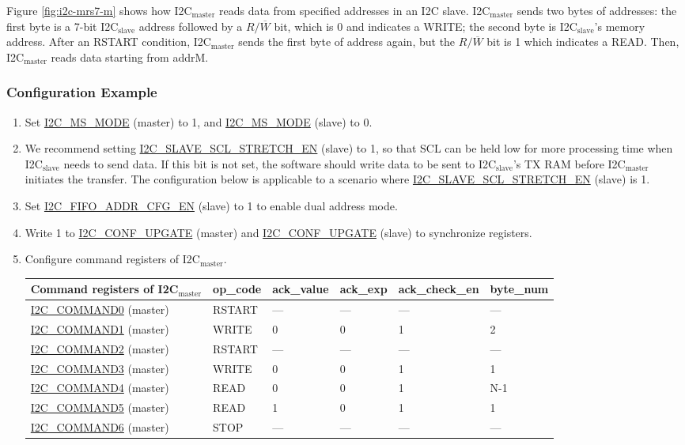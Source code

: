 \documentclass[main\_\_EN.tex]{subfiles}
\begin{document}
Figure \ref{fig:i2c-mrs7-m} shows how I2C$_\text{master}$ reads data from specified addresses in an I2C slave. I2C$_\text{master}$ sends two bytes of addresses: the first byte is a 7-bit I2C$_\text{slave}$ address followed by a $R/\overline W$ bit, which is 0 and indicates a WRITE; the second byte is I2C$_\text{slave}$'s memory address. After an RSTART condition, I2C$_\text{master}$ sends the first byte of address again, but the $R/\overline W$ bit is 1 which indicates a READ. Then, I2C$_\text{master}$ reads data starting from addrM.

\subsubsection{Configuration Example}
\begin{enumerate}
\item Set \hyperref[fielddesc:I2CMSMODE]{I2C\_MS\_MODE} (master) to 1, and \hyperref[fielddesc:I2CMSMODE]{I2C\_MS\_MODE} (slave) to 0.
\item We recommend setting \hyperref[fielddesc:I2CSLAVESCLSTRETCHEN]{I2C\_SLAVE\_SCL\_STRETCH\_EN} (slave) to 1, so that SCL can be held low for more processing time when I2C$_\text{slave}$ needs to send data. If this bit is not set, the software should write data to be sent to I2C$_\text{slave}$'s TX RAM before I2C$_\text{master}$ initiates the transfer. The configuration below is applicable to a scenario where \hyperref[fielddesc:I2CSLAVESCLSTRETCHEN]{I2C\_SLAVE\_SCL\_STRETCH\_EN} (slave) is 1. 
\item  Set \hyperref[fielddesc:I2CFIFOADDRCFGEN]{I2C\_FIFO\_ADDR\_CFG\_EN} (slave) to 1 to enable dual address mode.
\item Write 1 to \hyperref[fielddesc:I2CCONFUPGATE]{I2C\_CONF\_UPGATE} (master) and \hyperref[fielddesc:I2CCONFUPGATE]{I2C\_CONF\_UPGATE} (slave) to synchronize registers.
\item Configure command registers of I2C$_\text{master}$.
\begin{longtable}{ | p{4cm} | p{2cm} | p{2cm} | p{2cm} |p{2cm} | p{2cm} |}
\hline\rowcolor{lightgray}
Command registers of I2C$_\text{master}$& op\_code & ack\_value&ack\_exp&ack\_check\_en&byte\_num  \\ \hline
\hyperref[fielddesc:I2CCOMMAND0]{I2C\_COMMAND0} (master)& RSTART& ---&---&---&---  \\ \hline
\hyperref[fielddesc:I2CCOMMAND1]{I2C\_COMMAND1} (master)& WRITE& 0&0&1&2  \\ \hline
\hyperref[fielddesc:I2CCOMMAND2]{I2C\_COMMAND2} (master)& RSTART& ---&---&---&---  \\ \hline
\hyperref[fielddesc:I2CCOMMAND3]{I2C\_COMMAND3} (master)& WRITE& 0&0&1&1  \\ \hline
\hyperref[fielddesc:I2CCOMMAND4]{I2C\_COMMAND4} (master)& READ& 0&0&1&N-1  \\ \hline
\hyperref[fielddesc:I2CCOMMAND5]{I2C\_COMMAND5} (master)& READ& 1&0&1&1  \\ \hline
\hyperref[fielddesc:I2CCOMMAND6]{I2C\_COMMAND6} (master)& STOP& ---&---&---&---  \\ \hline
\end{longtable}


\end{enumerate}
\end{document}

